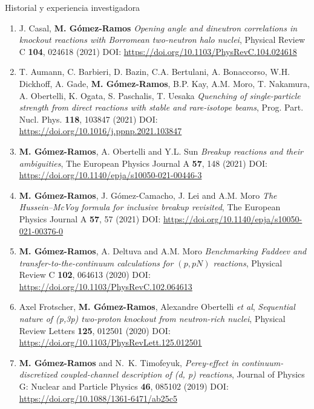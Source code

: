 \documentclass{resume2} %
\begin{document}
\begin{rSection}{Historial y experiencia investigadora}
\begin{enumerate}[label=\alph*.]
\begin{enumerate}[label=\arabic*.]
\item J. Casal, {\bf M. G\'omez-Ramos} {\it Opening angle and dineutron correlations in knockout reactions with Borromean two-neutron halo nuclei}, Physical Review C \textbf{104}, 024618 (2021) DOI: \url{https://doi.org/10.1103/PhysRevC.104.024618}

\item T. Aumann, C. Barbieri, D. Bazin, C.A. Bertulani, A. Bonaccorso, W.H. Dickhoff, A. Gade, {\bf M. Gómez-Ramos}, B.P. Kay, A.M. Moro, T. Nakamura, A. Obertelli, K. Ogata, S. Paschalis, T. Uesaka
{\it Quenching of single-particle strength from direct reactions with stable and rare-isotope beams}, Prog. Part. Nucl. Phys. \textbf{118}, 103847 (2021) DOI: \url{https://doi.org/10.1016/j.ppnp.2021.103847}

\item {\bf M. G\'omez-Ramos},  A. Obertelli and Y.L. Sun
 {\it Breakup reactions and their ambiguities}, The European Physics Journal A \textbf{57}, 148 (2021) DOI: \url{https://doi.org/10.1140/epja/s10050-021-00446-3}

\item {\bf M. G\'omez-Ramos}, J. G\'omez-Camacho, J. Lei and A.M. Moro
 {\it The Hussein–McVoy formula for inclusive breakup revisited}, The European Physics Journal A \textbf{57}, 57 (2021) DOI: \url{https://doi.org/10.1140/epja/s10050-021-00376-0}

\item {\bf M. G\'omez-Ramos}, A. Deltuva and A.M. Moro {\it Benchmarking Faddeev and transfer-to-the-continuum calculations for $(p,pN)$ reactions}, Physical Review C \textbf{102}, 064613 (2020) DOI: \url{https://doi.org/10.1103/PhysRevC.102.064613}


\item Axel Frotscher, {\bf M. G\'omez-Ramos}, Alexandre Obertelli  \textit{et al}, {\it Sequential nature of (p,3p) two-proton knockout from neutron-rich nuclei}, Physical Review Letters {\bf 125}, 012501 (2020) DOI: \url{https://doi.org/10.1103/PhysRevLett.125.012501}




\item {\bf M. G\'omez-Ramos} and N.~K. Timofeyuk, {\it Perey-effect in continuum-discretized coupled-channel description of (d, p)
reactions}, Journal of Physics G: Nuclear and Particle Physics {\bf 46}, 085102 (2019)  DOI: \url{https://doi.org/10.1088/1361-6471/ab25c5}


\end{enumerate}
\end{enumerate}
\end{rSection}
\end{document}
